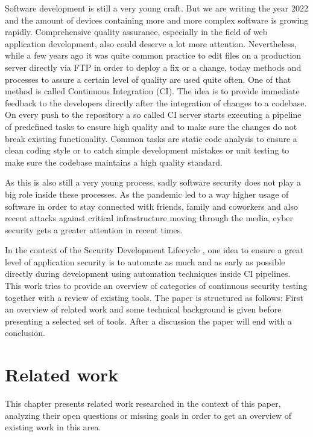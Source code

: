 \documentclass[conference]{IEEEtran}
\begin{document}
Software development is still a very young craft. But we are writing the year 2022 and the amount of devices containing more and more complex software is growing rapidly. Comprehensive quality assurance, especially in the field of web application development, also could deserve a lot more attention. Nevertheless, while a few years ago it was quite common practice to edit files on a production server directly via FTP in order to deploy a fix or a change, today methods and processes to assure a certain level of quality are used quite often. One of that method is called Continuous Integration (CI). The idea is to provide immediate feedback to the developers directly after the integration of changes to a codebase. On every push to the repository a so called CI server starts executing a pipeline of predefined tasks to ensure high quality and to make sure the changes do not break existing functionality. Common tasks are static code analysis to ensure a clean coding style or to catch simple development mistakes or unit testing to make sure the codebase maintains a high quality standard.

As this is also still a very young process, sadly software security does not play a big role inside these processes. As the pandemic led to a way higher usage of software in order to stay connected with friends, family and coworkers and also recent attacks against critical infrastructure moving through the media, cyber security gets a greater attention in recent times.

In the context of the Security Development Lifecycle \cite{sdl}, one idea to ensure a great level of application security is to automate as much and as early as possible directly during development using automation techniques inside CI pipelines. This work tries to provide an overview of categories of continuous security testing together with a review of existing tools. The paper is structured as follows: First an overview of related work and some technical background is given before presenting a selected set of tools. After a discussion the paper will end with a conclusion.

\section{Related work}

This chapter presents related work researched in the context of this paper, analyzing their open questions or missing goals in order to get an overview of existing work in this area.\\
\end{document}
